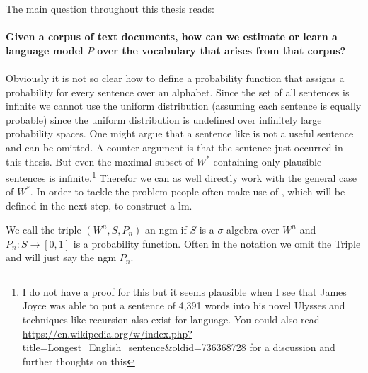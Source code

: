 \documentclass[•]{book}
\begin{document}
The main question throughout this thesis reads:\\
\\
\textbf{Given a corpus of text documents, how can we estimate or learn a language model $P$ over the vocabulary that arises from that corpus?} 
\\
\\
Obviously it is not so clear how to define a probability function that assigns a probability for every sentence over an alphabet. 
Since the set of all sentences is infinite we cannot use the uniform distribution (assuming each sentence is equally probable) since the uniform distribution is undefined over infinitely large probability spaces.  
One might argue that a sentence like  is not a useful sentence and can be omitted. 
A counter argument is that the sentence just occurred in this thesis. 
But even the maximal subset of $W^{*}$ containing only plausible sentences is infinite.\footnote{I do not have a proof for this but it seems plausible when I see that James Joyce was able to put a sentence of 4,391 words into his novel Ulysses and techniques like recursion also exist for language. You could also read \url{https://en.wikipedia.org/w/index.php?title=Longest_English_sentence&oldid=736368728} for a discussion and further thoughts on this}
Therefor we can as well directly work with the general case of $W^{*}$.
In order to tackle the problem people often make use of , which will be defined in the next step, to construct a \gls{lm}.  

\begin{definition}\label{def:ngram-model}We call the triple $(W^{n}, S, P_n)$ an \gls{ngm} if $S$ is a $\sigma$-algebra over $W^{n}$ and $P_n:S\longrightarrow [0,1]$ is a probability function. Often in the notation we omit the Triple and will just say the \gls{ngm} $P_n$. 
\end{definition}
\end{document}
